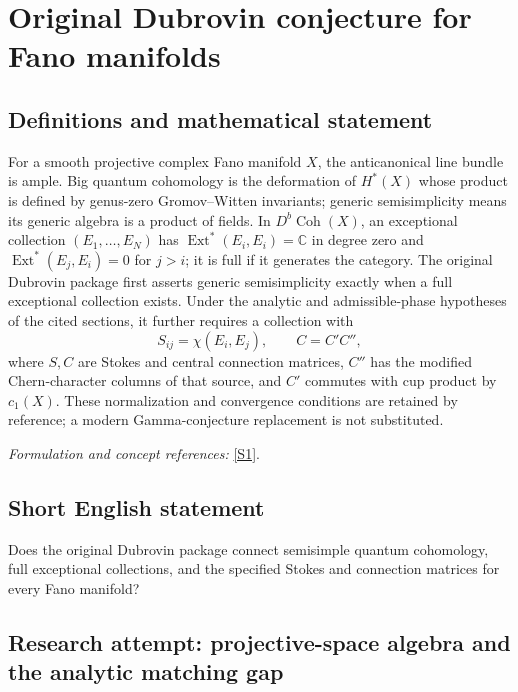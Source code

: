 \documentclass[11pt]{article}
\begin{document}
\section*{\texorpdfstring{Original Dubrovin conjecture for Fano manifolds}{Original Dubrovin conjecture for Fano manifolds}}\label{statement}
\subsection{Definitions and mathematical statement}
For a smooth projective complex Fano manifold $X$, the anticanonical line bundle is ample. Big quantum cohomology is the deformation of $H^*(X)$ whose product is defined by genus-zero Gromov--Witten invariants; generic semisimplicity means its generic algebra is a product of fields. In $D^b\operatorname{Coh}(X)$, an exceptional collection $(E_1,\ldots,E_N)$ has $\operatorname{Ext}^*(E_i,E_i)={\mathbb{C}}$ in degree zero and $\operatorname{Ext}^*(E_j,E_i)=0$ for $j>i$; it is full if it generates the category. The original Dubrovin package first asserts generic semisimplicity exactly when a full exceptional collection exists. Under the analytic and admissible-phase hypotheses of the cited sections, it further requires a collection with
\[
 S_{ij}=\chi(E_i,E_j),\qquad C=C'C'',
\]
where $S,C$ are Stokes and central connection matrices, $C''$ has the modified Chern-character columns of that source, and $C'$ commutes with cup product by $c_1(X)$. These normalization and convergence conditions are retained by reference; a modern Gamma-conjecture replacement is not substituted.
\par\smallskip\textit{Formulation and concept references:} \href{https://arxiv.org/pdf/1404.6407v4}{[S1]}.

\subsection{Short English statement}
Does the original Dubrovin package connect semisimple quantum cohomology, full exceptional collections, and the specified Stokes and connection matrices for every Fano manifold?
\subsection{Research attempt: projective-space algebra and the analytic matching gap}
\end{document}
